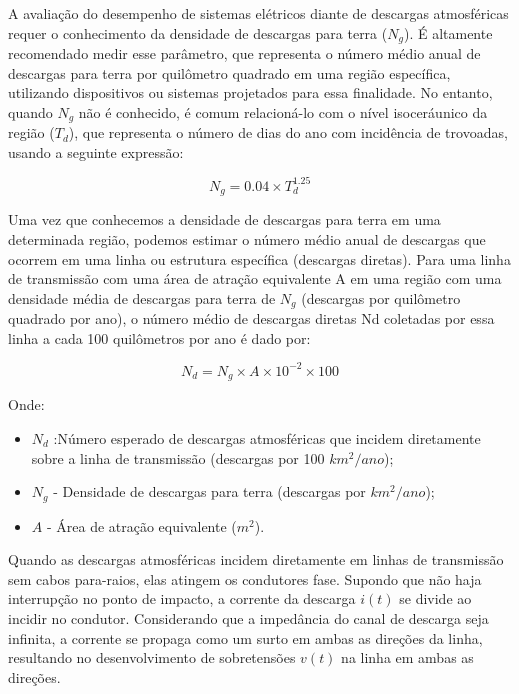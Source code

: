 \documentclass[a4paper, 12pt, onecolumn,singlespacing]{article}
\begin{document}
	A avaliação do desempenho de sistemas elétricos diante de descargas atmosféricas requer o conhecimento da densidade de descargas para terra ($N_g$). É altamente recomendado medir esse parâmetro, que representa o número médio anual de descargas para terra por quilômetro quadrado em uma região específica, utilizando dispositivos ou sistemas projetados para essa finalidade. No entanto, quando $N_g$ não é conhecido, é comum relacioná-lo com o nível isoceráunico da região ($T_d$), que representa o número de dias do ano com incidência de trovoadas, usando a seguinte expressão:
	
	\begin{equation}
	N_g = 0.04 \times T_d^{1.25}	
	\end{equation}

	Uma vez que conhecemos a densidade de descargas para terra em uma determinada região, podemos estimar o número médio anual de descargas que ocorrem em uma linha ou estrutura específica (descargas diretas). Para uma linha de transmissão com uma área de atração equivalente A em uma região com uma densidade média de descargas para terra de $N_g$ (descargas por quilômetro quadrado por ano), o número médio de descargas diretas Nd coletadas por essa linha a cada 100 quilômetros por ano é dado por:
	
	\begin{equation}
		N_d = N_g \times A \times 10^{-2} \times 100
	\end{equation}
	
	Onde:
	\begin{itemize}
		\item 	\textbf{\textit{$N_d$ }}:Número esperado de descargas atmosféricas que incidem diretamente sobre a linha de transmissão (descargas por 100 $km^2/ano$);
		\item \textbf{\textit{$N_g$}} - Densidade de descargas para terra (descargas por $km^2/ano$);
		\item \textbf{\textit{$A$}} - Área de atração equivalente ($m^2$).
	\end{itemize}

	Quando as descargas atmosféricas incidem diretamente em linhas de transmissão sem cabos para-raios, elas atingem os condutores fase. Supondo que não haja interrupção no ponto de impacto, a corrente da descarga $i(t)$ se divide ao incidir no condutor. Considerando que a impedância do canal de descarga seja infinita, a corrente se propaga como um surto em ambas as direções da linha, resultando no desenvolvimento de sobretensões $v(t)$ na linha em ambas as direções.
	
\end{document}
